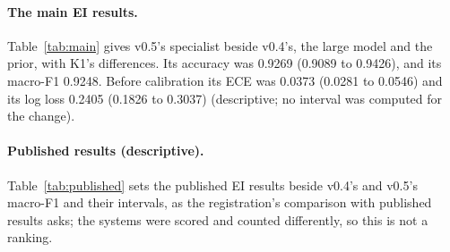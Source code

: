 \documentclass[11pt,letterpaper]{article}
\begin{document}
\begin{table}[t]
\centering\small
\caption{The four criteria on Evidence Inference 2.0's test split (1,218 prompts in 333 articles), for v0.4 as registered (H1 to H4) and for v0.5 as the update fixed them. ECE is the expected calibration error. Criteria 2 and 3 give the difference in log loss with its 95 percent interval from 10,000 article resamples; the large model is Gemma 4 31B-it, calibrated on validation and reading the same input as each specialist (4,096 tokens for v0.4, 6,144 for v0.5).}
\label{tab:bar}

\end{table}

\paragraph{The main EI results.} Table~\ref{tab:main} gives v0.5's specialist beside v0.4's, the large model and the prior, with K1's differences. Its accuracy was 0.9269 (0.9089 to 0.9426), and its macro-F1 0.9248. Before calibration its ECE was 0.0373 (0.0281 to 0.0546) and its log loss 0.2405 (0.1826 to 0.3037) (descriptive; no interval was computed for the change).

\begin{table}[t]
\centering\footnotesize
\caption{Evidence Inference 2.0, test split (1,218 prompts in 333 articles), each system calibrated on validation. Each cell gives the estimate and its 95 percent interval from 1,000 article resamples. ECE is the expected calibration error, whose percentile interval can lie above its estimate, since the ECE is biased upward in resamples; the Brier score is summed over the three answers. Gemma 4 31B-it reads the same 6,144-token input as v0.5; v0.4's results are on its own 4,096-token input. The prior gives every prompt the training split's answer shares. The last two rows give K1's paired differences (registered), v0.5's specialist minus each reference on the same resamples; the bar itself is decided by Table~\ref{tab:bar}'s intervals, from 10,000 resamples. \textsuperscript{\dag}No difference was detected: the interval includes zero.}
\label{tab:main}
\setlength{\tabcolsep}{3.5pt}

\end{table}

\paragraph{Published results (descriptive).} Table~\ref{tab:published} sets the published EI results beside v0.4's and v0.5's macro-F1 and their intervals, as the registration's comparison with published results asks; the systems were scored and counted differently, so this is not a ranking.
\end{document}
